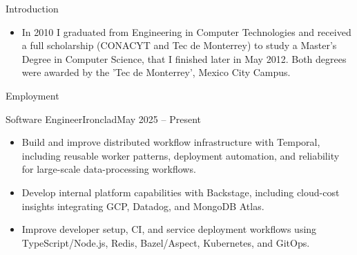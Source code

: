 \documentclass[calibri]{../mcdowell-cv/mcdowellcv}
\begin{document}
	\makeheader
	
	\begin{cvsection}{Introduction}
		\begin{cvsubsection}{}{}{}
			\begin{itemize}
					\item In 2010 I graduated from Engineering in Computer Technologies and received a full scholarship (CONACYT and Tec de Monterrey) to study a Master’s Degree in Computer Science, that I finished later in May 2012. Both degrees were awarded by the ’Tec de Monterrey’, Mexico City Campus.
			\end{itemize}
		\end{cvsubsection}
	\end{cvsection}

	\begin{cvsection}{Employment}
		\begin{cvsubsection}{Software Engineer}{Ironclad}{May 2025 -- Present}
			\begin{itemize}
				\item Build and improve distributed workflow infrastructure with Temporal, including reusable worker patterns, deployment automation, and reliability for large-scale data-processing workflows.
			\end{itemize}
			\begin{itemize}
				\item Develop internal platform capabilities with Backstage, including cloud-cost insights integrating GCP, Datadog, and MongoDB Atlas.
			\end{itemize}
			\begin{itemize}
				\item Improve developer setup, CI, and service deployment workflows using TypeScript/Node.js, Redis, Bazel/Aspect, Kubernetes, and GitOps.
			\end{itemize}
		\end{cvsubsection}


\end{cvsection}
\end{document}
